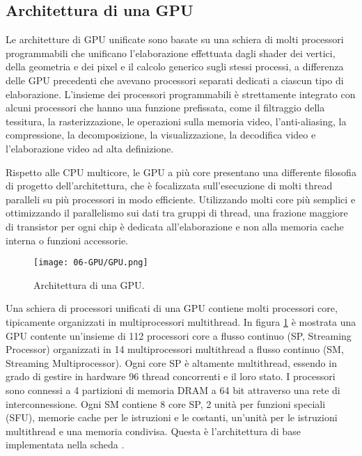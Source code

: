 \subsection{Architettura di una GPU}

Le architetture di GPU unificate sono basate su una schiera di molti processori programmabili che unificano l'elaborazione effettuata dagli shader dei vertici, della geometria e dei pixel e il calcolo generico sugli stessi processi, a differenza delle GPU precedenti che avevano processori separati dedicati a ciascun tipo di elaborazione. L'insieme dei processori programmabili è strettamente integrato con alcuni processori che hanno una funzione prefissata, come il filtraggio della tessitura, la rasterizzazione, le operazioni sulla memoria video, l'anti-aliasing, la compressione, la decomposizione, la visualizzazione, la decodifica video e l'elaborazione video ad alta definizione. 

Rispetto alle CPU multicore, le GPU a più core presentano una differente filosofia di progetto dell'architettura, che è focalizzata sull'esecuzione di molti thread paralleli su più processori in modo efficiente. Utilizzando molti core più semplici e ottimizzando il parallelismo sui dati tra gruppi di thread, una frazione maggiore di transistor per ogni chip è dedicata all'elaborazione e non alla memoria cache interna o funzioni accessorie.

\begin{figure}[h]
    \centering
    \texttt{[image: 06-GPU/GPU.png]}
    \caption{Architettura di una GPU.}
    \label{fig:GPU}
\end{figure}

Una schiera di processori unificati di una GPU contiene molti processori core, tipicamente organizzati in multiprocessori multithread. In figura \ref{fig:GPU} è mostrata una GPU contente un'insieme di 112 processori core a flusso continuo (SP, Streaming Processor) organizzati in 14 multiprocessori multithread a flusso continuo (SM, Streaming Multiprocessor). Ogni core SP è altamente multithread, essendo in grado di gestire in hardware 96 thread concorrenti e il loro stato. I processori sono connessi a 4 partizioni di memoria DRAM a 64 bit attraverso una rete di interconnessione. Ogni SM  contiene 8 core SP, 2 unità per funzioni speciali (SFU), memorie cache per le istruzioni e le costanti, un'unità per le istruzioni multithread e una memoria condivisa. Questa è l'architettura di base implementata nella scheda .

